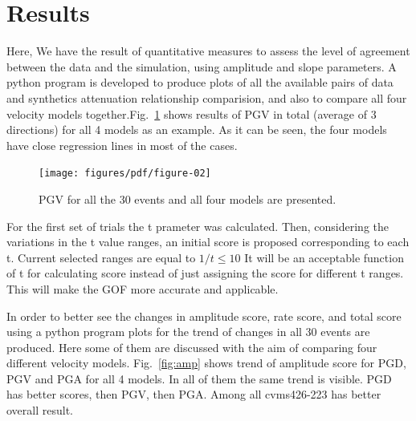 
\section{Results}

Here, We have the result of quantitative measures to assess the level of agreement between the data and the simulation, using amplitude and slope parameters. A python program is developed to produce plots of all the available pairs of data and synthetics attenuation relationship comparision, and also to compare all four velocity models together.Fig.~\ref{fig:pgv} shows results of PGV in total (average of 3 directions) for all 4 models as an example. As it can be seen, the four models have close regression lines in most of the cases.

\begin{figure}
    \centering
    \texttt{[image: figures/pdf/figure-02]}
    \caption{PGV for all the 30 events and all four models are presented.}
    \label{fig:pgv}
\end{figure}

For the first set of trials the t prameter was calculated. Then, considering the variations in the t value ranges, an initial score is proposed corresponding to each t. Current selected ranges are equal to  $1/t \leq 10$ It will be an acceptable function of t for calculating score instead of just assigning the score for different t ranges. This will make the GOF more accurate and applicable.

In order to better see the changes in amplitude score, rate score, and total score using a python program plots for the trend of changes in all 30 events are produced. Here some of them are discussed with the aim of comparing four different velocity models. Fig.~\ref{fig:amp} shows trend of amplitude score for PGD, PGV and PGA for all 4 models. In all of them the same trend is visible. PGD has better scores, then PGV, then PGA. Among all cvms426-223 has better overall result.

